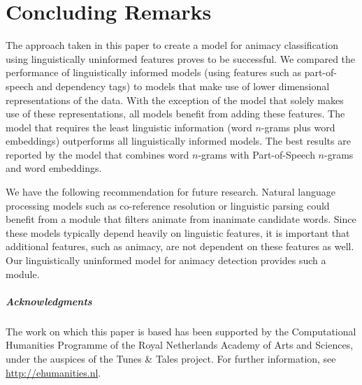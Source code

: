 \documentclass[a4paper,UKenglish]{oasics}
\begin{document}
\section{Concluding Remarks}

The approach taken in this paper to create a model for animacy
classification using linguistically uninformed features proves to be
successful. We compared the performance of linguistically informed
models (using features such as part-of-speech and dependency tags) to
models that make use of lower dimensional representations of the
data. With the exception of the model that solely makes use of these
representations, all models benefit from adding these features. The
model that requires the least linguistic information (word $n$-grams
plus word embeddings) outperforms all linguistically informed
models. The best results are reported by the model that combines word
$n$-grams with Part-of-Speech $n$-grams and word embeddings.

We have the following recommendation for future research. Natural
language processing models such as co-reference resolution or
linguistic parsing could benefit from a module that filters animate
from inanimate candidate words. Since these models typically depend
heavily on linguistic features, it is important that additional
features, such as animacy, are not dependent on these features as
well. Our linguistically uninformed model for animacy detection
provides such a module.


\subparagraph*{Acknowledgments}

The work on which this paper is based has been supported by the
Computational Humanities Programme of the Royal Netherlands Academy of
Arts and Sciences, under the auspices of the Tunes \& Tales
project. For further information, see \url{http://ehumanities.nl}.


\end{document}
